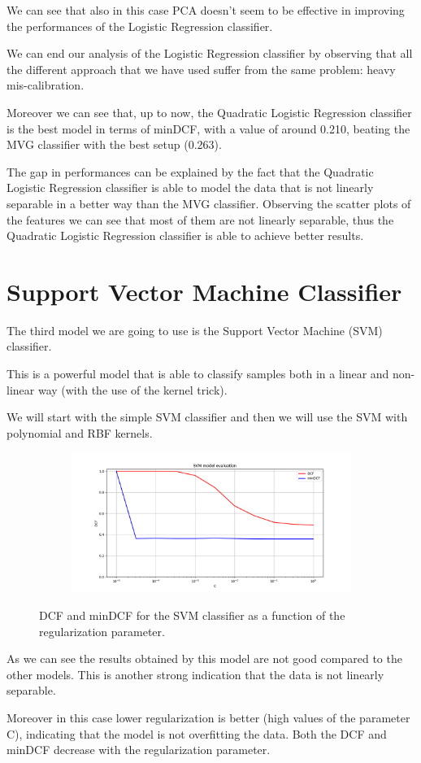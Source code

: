 \documentclass[12pt]{report}
\newcommand{\nnl}{%
    \newline
    \newline
}
\newcommand{\nl}{%
    \newline
    \noindent
}
\begin{document}
\noindent
We can see that also in this case PCA doesn't seem to be effective in improving the performances of the Logistic Regression classifier.
\nnl
We can end our analysis of the Logistic Regression classifier by observing that all the different approach that we have used suffer from the same problem: heavy mis-calibration.
\nnl
Moreover we can see that, up to now, the Quadratic Logistic Regression classifier is the best model in terms of minDCF, with a value of around 0.210, beating the MVG classifier with the best setup (0.263).
\nl
The gap in performances can be explained by the fact that the Quadratic Logistic Regression classifier is able to model the data that is not linearly separable in a better way than the MVG classifier. Observing the scatter plots of the features we can see that most of them are not linearly separable, thus the Quadratic Logistic Regression classifier is able to achieve better results.

\section{Support Vector Machine Classifier}
The third model we are going to use is the Support Vector Machine (SVM) classifier.
\nl
This is a powerful model that is able to classify samples both in a linear and non-linear way (with the use of the kernel trick).
\nnl
We will start with the simple SVM classifier and then we will use the SVM with polynomial and RBF kernels.

\begin{figure}[H]
    \centering
    \begin{subfigure}[t]{0.6\textwidth}
        \includegraphics[width=\textwidth]{./plot/SVM/svm.png}
    \end{subfigure}
    \caption{DCF and minDCF for the SVM classifier as a function of the regularization parameter.}
    \label{fig:svm}
\end{figure}
\noindent
As we can see the results obtained by this model are not good compared to the other models. This is another strong indication that the data is not linearly separable.
\nl
Moreover in this case lower regularization is better (high values of the parameter C), indicating that the model is not overfitting the data. Both the DCF and minDCF decrease with the regularization parameter.
\end{document}
